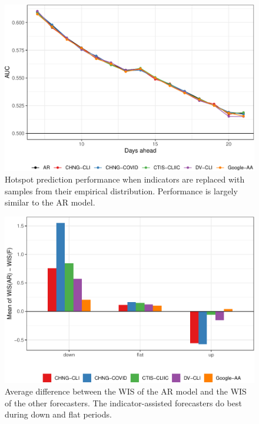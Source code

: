 \clearpage

\begin{figure}

{\centering \includegraphics[width=\textwidth]{fig/hot-booted-1} 

}

\caption{Hotspot prediction performance when indicators are replaced with samples from their empirical distribution. Performance is largely similar to the AR model.}\label{fig:hot-booted}
\end{figure}

\clearpage

\begin{figure}

{\centering \includegraphics[width=\textwidth]{fig/upswing-summary-1} 

}

\caption{Average difference between the WIS of the AR model and the WIS of the other forecasters. The indicator-assisted forecasters do best during down and flat periods.}\label{fig:upswing-summary}
\end{figure}


